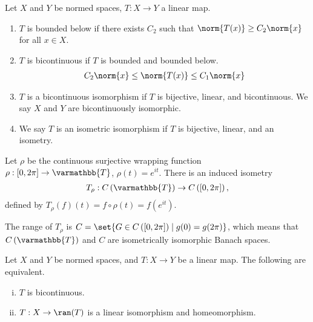 \documentclass[10pt]{mypackage}
\renewcommand*{\mathbb}[1]{\varmathbb{#1}}
\begin{document}
\begin{definition}
  Let $X$ and $Y$ be normed spaces, $T: X\rightarrow Y$ a linear map.
  \begin{enumerate}[(1)]
    \item $T$ is bounded below if there exists $C_2$ such that $\norm{T(x)}\geq C_2\norm{x}$ for all $x\in X$.
    \item $T$ is bicontinuous if $T$ is bounded and bounded below.
      \begin{align*}
        C_2\norm{x} \leq \norm{T(x)}\leq C_1\norm{x}
      \end{align*}
    \item $T$ is a bicontinuous isomorphism if $T$ is bijective, linear, and bicontinuous. We say $X$ and $Y$ are bicontinuously isomorphic.
    \item We say $T$ is an isometric isomorphism if $T$ is bijective, linear, and an isometry.
  \end{enumerate}
\end{definition}
\begin{example}
  Let $\rho$ be the continuous surjective wrapping function $\rho: [0,2\pi]\rightarrow \mathbb{T}$, $\rho(t) = e^{it}$. There is an induced isometry
  \begin{align*}
    T_{\rho}: C\left(\mathbb{T}\right) \rightarrow C\left([0,2\pi]\right),
  \end{align*}
  defined by $T_{\rho}\left(f\right)(t) = f\circ \rho\left(t\right) = f\left(e^{it}\right)$.\newline

  The range of $T_{\rho}$ is $C= \set{G\in C\left([0,2\pi]\right)\mid g(0) = g(2\pi)}$, which means that $C\left(\mathbb{T}\right) $ and $ C$ are isometrically isomorphic Banach spaces.
\end{example}
\begin{proposition}
  Let $X$ and $Y$ be normed spaces, and $T:X\rightarrow Y$ be a linear map. The following are equivalent.
  \begin{enumerate}[(i)]
    \item $T$ is bicontinuous.
    \item $T: X\rightarrow \ran(T)$ is a linear isomorphism and homeomorphism.
  \end{enumerate}
\end{proposition}
\end{document}
